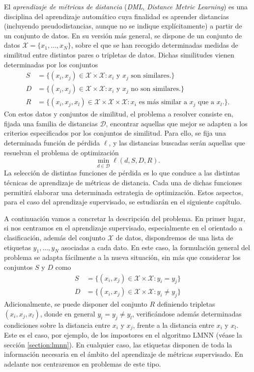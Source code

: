 \documentclass{book}
\begin{document}
	El \emph{aprendizaje de métricas de distancia} (\emph{DML}, \emph{Distance Metric Learning}) es una disciplina del aprendizaje automático cuya finalidad es aprender distancias (incluyendo pseudodistancias, aunque no se indique explícitamente) a partir de un conjunto de datos. En su versión más general, se dispone de un conjunto de datos $\mathcal{X} = \{x_1,\dots,x_N\}$, sobre el que se han recogido determinadas medidas de similitud entre distintos pares o tripletas de datos. Dichas similitudes vienen determinadas por los conjuntos
	\begin{align*}
		S &= \{(x_i,x_j) \in \mathcal{X}\times\mathcal{X} \colon x_i \text{ y } x_j \text{ son similares.} \} \\
		D &= \{(x_i,x_j) \in \mathcal{X}\times\mathcal{X} \colon x_i \text{ y } x_j \text{ no son similares.} \} \\
		R &= \{(x_i,x_j,x_l) \in \mathcal{X}\times\mathcal{X}\times\mathcal{X} \colon x_i \text{ es más similar a } x_j \text{ que a } x_l. \}.
	\end{align*}
	Con estos datos y conjuntos de similitud, el problema a resolver consiste en, fijada una familia de distancias $\mathcal{D}$, encontrar aquellas que mejor se adapten a los criterios especificados por los conjuntos de similitud. Para ello, se fija una determinada función de pérdida $\ell$, y las distancias buscadas serán aquellas que resuelvan el problema de optimización
	\[ \min_{d \in \mathcal{D}} \ell(d,S,D,R) .\]
	La selección de distintas funciones de pérdida es lo que conduce a las distintas técnicas de aprendizaje de métricas de distancia. Cada una de dichas funciones permitirá elaborar una determinada estrategia de optimización. Estos aspectos, para el caso del aprendizaje supervisado, se estudiarán en el siguiente capítulo.

	A continuación vamos a concretar la descripción del problema. En primer lugar, si nos centramos en el aprendizaje supervisado, especialmente en el orientado a clasificación, además del conjunto $\mathcal{X}$ de datos, dispondremos de una lista de etiquetas $y_1,\dots,y_N$ asociadas a cada dato. En este caso, la formulación general del problema se adapta fácilmente a la nueva situación, sin más que considerar los conjuntos $S$ y $D$ como
	\begin{align*}
		S &= \{(x_i,x_j) \in \mathcal{X}\times\mathcal{X} \colon y_i = y_j\} \\
		D &= \{(x_i,x_j) \in \mathcal{X}\times\mathcal{X} \colon y_i \ne y_j\} 
	\end{align*}
	Adicionalmente, se puede disponer del conjunto $R$ definiendo tripletas $(x_i,x_j,x_l)$, donde en general $y_i = y_j \ne y_l$, verificándose además determinadas condiciones sobre la distancia entre $x_i$ y $x_j$, frente a la distancia entre $x_i$ y $x_l$. Este es el caso, por ejemplo, de los impostores en el algoritmo LMNN (véase la sección \ref{section:lmnn}). En cualquier caso, las etiquetas disponen de toda la información necesaria en el ámbito del aprendizaje de métricas supervisado. En adelante nos centraremos en problemas de este tipo.
\end{document}
